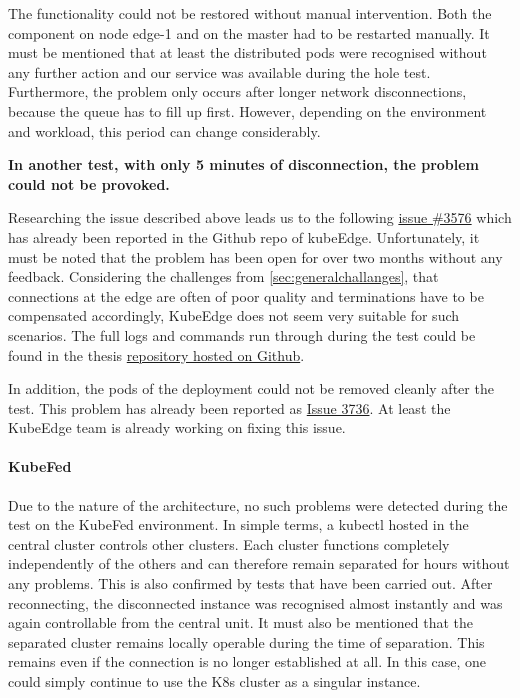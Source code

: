 \documentclass[MSC,Master,english]{twbook}%
\begin{document}
The functionality could not be restored without manual intervention. Both the component on node edge-1 and on the master had to be restarted manually. It must be mentioned that at least the distributed pods were recognised without any further action and our service was available during the hole test. Furthermore, the problem only occurs after longer network disconnections, because the queue has to fill up first. However, depending on the environment and workload, this period can change considerably.\par
\vspace{\baselineskip}
\textbf{In another test, with only 5 minutes of disconnection, the problem could not be provoked.}\par
\vspace{\baselineskip}
Researching the issue described above leads us to the following \hyperref{https://github.com/kubeedge/kubeedge/issues/3567}{}{}{issue \#3576}\cite{gh-ke-issue3567} which has already been reported in the Github repo of kubeEdge. Unfortunately, it must be noted that the problem has been open for over two months without any feedback. Considering the challenges from \autoref{sec:generalchallanges}, that connections at the edge are often of poor quality and terminations have to be compensated accordingly, KubeEdge does not seem very suitable for such scenarios. The full logs and commands run through during the test could be found in the thesis \hyperref{https://github.com/Berndinox/K8sEdge/blob/main/Tests/network/kubeedge-reconnect-issue.md}{}{}{repository hosted on Github}\cite{bk-gh-ke-reconnect}. \par

In addition, the pods of the deployment could not be removed cleanly after the test. This problem has already been reported as \hyperref{https://github.com/kubeedge/kubeedge/issues/3736
}{}{}{Issue 3736}\cite{ke-gh-issue3736}. At least the KubeEdge team is already working on fixing this issue.

\paragraph{KubeFed} Due to the nature of the architecture, no such problems were detected during the test on the KubeFed environment. In simple terms, a kubectl hosted in the central cluster controls other clusters. Each cluster functions completely independently of the others and can therefore remain separated for hours without any problems. This is also confirmed by tests that have been carried out. After reconnecting, the disconnected instance was recognised almost instantly and was again controllable from the central unit. It must also be mentioned that the separated cluster remains locally operable during the time of separation. This remains even if the connection is no longer established at all. In this case, one could simply continue to use the \ac{K8s} cluster as a singular instance.
\end{document}
